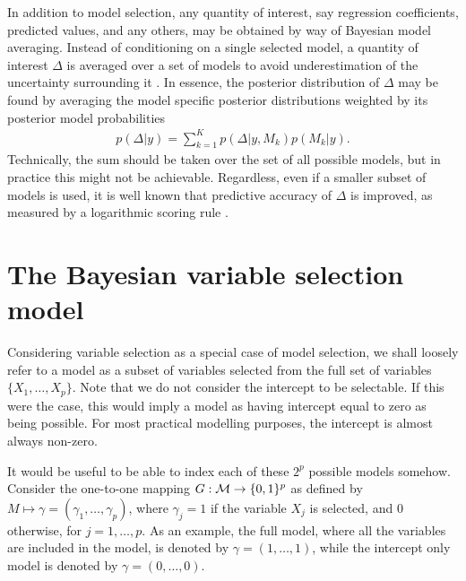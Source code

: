 \documentclass[a4paper,showframe,11pt]{report}
\begin{document}
In addition to model selection, any quantity of interest, say regression coefficients, predicted values, and any others, may be obtained by way of Bayesian model averaging.
Instead of conditioning on a single selected model, a quantity of interest $\Delta$ is averaged over a set of models to avoid underestimation of the uncertainty surrounding it \citep{madigan1994model}.
In essence, the posterior distribution of $\Delta$ may be found by averaging the model specific posterior distributions weighted by its posterior model probabilities
\begin{align}\label{eq:bma}
  p(\Delta|y) = \sum_{k=1}^K p(\Delta|y,M_k)p(M_k|y).
\end{align}
Technically, the sum should be taken over the set of all possible models, but in practice this might not be achievable.
Regardless, even if a smaller subset of models is used, it is well known that predictive accuracy of $\Delta$ is improved, as measured by a logarithmic scoring rule \citep{raftery1997bayesian}.

\section{The Bayesian variable selection model}

Considering variable selection as a special case of model selection, we shall loosely refer to a model as a subset of variables selected from the full set of variables $\{ X_1, \dots, X_p \}$. 
Note that we do not consider the intercept to be selectable. 
If this were the case, this would imply a model as having intercept equal to zero as being possible. 
For most practical modelling purposes, the intercept is almost always non-zero.

It would be useful to be able to index each of these $2^p$ possible models somehow. 
Consider the one-to-one mapping $G:{\mathcal M} \to \{0,1\}^p$ as defined by $M \mapsto \gamma = (\gamma_1,\dots,\gamma_p)$, where $\gamma_j = 1$ if the variable $X_j$ is selected, and 0 otherwise, for $j=1,\dots,p$.
As an example, the full model, where all the variables are included in the model, is denoted by $\gamma = (1, \dots, 1)$, while the intercept only model is denoted by $\gamma = (0, \dots, 0)$.
\end{document}
